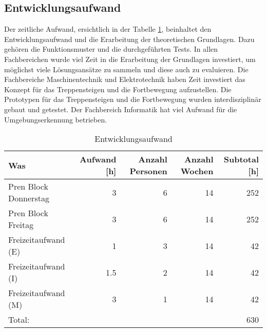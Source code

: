 \newpage

\subsection{Entwicklungsaufwand}
Der zeitliche Aufwand, ersichtlich in der Tabelle \ref{tab:entwicklungsaufwand}, beinhaltet den Entwicklungsaufwand und die Erarbeitung der theoretischen Grundlagen. Dazu gehören die Funktionsmuster und die durchgeführten Tests. In allen Fachbereichen wurde viel Zeit in die Erarbeitung der Grundlagen investiert, um möglichst viele Lösungsansätze zu sammeln und diese auch zu evaluieren. Die Fachbereiche Maschinentechnik und Elektrotechnik haben Zeit investiert das Konzept für das Treppensteigen und die Fortbewegung aufzustellen. Die Prototypen für das Treppensteigen und die Fortbewegung wurden interdisziplinär gebaut und getestet. Der Fachbereich Informatik hat viel Aufwand für die Umgebungserkennung betrieben.

\begin{center}
\begin{table}[H]
\begin{tabular}{|l|r|r|r|r|}
\hline
\textbf {Was} & \textbf{Aufwand [h]} &
\textbf{Anzahl Personen} & \textbf{Anzahl Wochen} & \textbf{Subtotal [h]}\\
\hline
Pren Block Donnerstag & 3 & 6 & 14 & 252 \\
\hline
Pren Block Freitag & 3 & 6 & 14 & 252 \\
\hline
Freizeitaufwand (E) & 1 & 3 & 14 & 42 \\
\hline
Freizeitaufwand (I) & 1.5 & 2 & 14 & 42 \\
\hline
Freizeitaufwand (M) & 3 & 1 & 14 & 42 \\
\hline
Total: & & & & 630 \\ \hline
\end{tabular}
\caption[Entwicklungsaufwand]{Entwicklungsaufwand}
\label{tab:entwicklungsaufwand}
\end{table}
\end{center}

